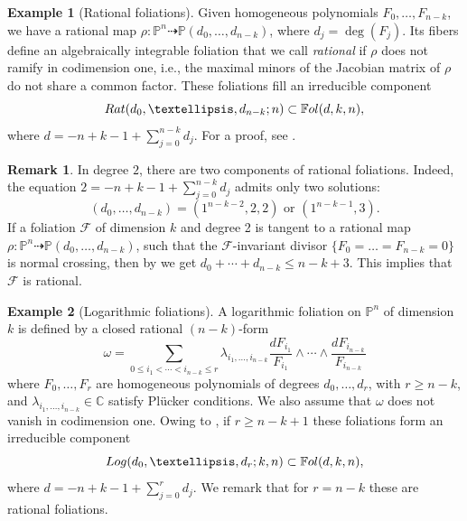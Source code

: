 \documentclass[twoside]{amsart}
\numberwithin{equation}{section}
\newcommand{\pn}{{\mathbb{P}^{n}}}
\def\PP{{\mathbb{P}}}
\def\CC{{\mathbb{C}}}
\newcommand{\sF}{\mathscr{F}}
\newcommand{\Fol}{\mathbb{F}{\rm ol}}
\newcommand{\rat}[2]{{\rm Rat}(#1;#2)}
\newcommand{\logg}[3]{{\rm Log}(#1;#2,#3)}
\theoremstyle{definition}
\newtheorem{example}{Example}[section]
\newtheorem{remark}{Remark}[section]
\begin{document}
\begin{example}[Rational foliations]\label{ex:rat-fols}
Given homogeneous polynomials $F_0, \dots , F_{n-k}$, we have a rational map $\rho \colon \pn \dashrightarrow \PP(d_0, \dots, d_{n-k})$, where $d_j = \deg(F_j)$. Its fibers define an algebraically integrable foliation that we call \emph{rational} if $\rho$ does not ramify in codimension one, i.e., the maximal minors of the Jacobian matrix of $\rho$ do not share a common factor. These foliations fill an irreducible component 
\[
\rat{d_0, \dots, d_{n-k}}{n} \subset \Fol( d, k, n),
\]
where $d = -n+k-1 + \sum_{j=0}^{n-k} d_j$. For a proof, see \cite{CPV1}.    
\end{example}


\begin{remark}\label{rem:Integraldeg2}
In degree $2$, there are two components of rational foliations. Indeed, the equation $2 = -n+k-1 + \sum_{j=0}^{n-k} d_j$ admits only two solutions:
\[
(d_0, \dots , d_{n-k}) = (1^{n-k-2}, 2,2) \text{ or } (1^{n-k-1}, 3).
\]
If a foliation $\sF$ of dimension $k$ and degree 2 is tangent to a rational map $\rho \colon \pn \dashrightarrow \mathbb{P}(d_0, \dots, d_{n-k})$, such that the $\sF$-invariant divisor $\{F_0 = \dots = F_{n-k} = 0\}$ is normal crossing, then by \cite{BruM} we get 
$d_0 + \cdots + d_{n-k} \leq n - k + 3$. This implies that $\sF$ is rational.
\end{remark}

\begin{example}[Logarithmic foliations]\label{ex:log-fols}
A logarithmic foliation on $\pn$ of dimension $k$ is defined by a closed rational $(n-k)$-form
\[
\omega = \sum_{0\leq i_1< \cdots <i_{n-k}\leq r} \lambda_{i_1, \dots , i_{n-k}}\frac{dF_{i_1}}{F_{i_1}}\wedge \cdots \wedge \frac{dF_{i_{n-k}}}{F_{i_{n-k}}}
\]
where $F_0, \dots , F_{r}$ are homogeneous polynomials of degrees $d_0, \dots, d_r$, with $r \geq n-k$, and $\lambda_{i_1, \dots , i_{n-k}} \in \CC$ satisfy Pl\"ucker conditions. We also assume that $\omega$ does not vanish in codimension one. Owing to 
\cite[Theorem 1.17]{CLNlog}, if $r\geq n-k+1$ these foliations form an irreducible component 
\[
\logg{d_0, \dots, d_r}{k}{n}\subset   \Fol( d, k, n), 
\]
where $d = -n+k-1 + \sum_{j=0}^{r} d_j$. We remark that for $r=n-k$ these are rational foliations. 
\end{example}
\end{document}
